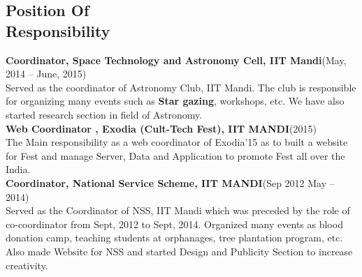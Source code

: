 \documentclass[a4paper,margin,line]{resume}
\begin{document}
\begin{resume}




	\section{\mysidestyle Position Of\\Responsibility}

	\textbf{Coordinator, Space Technology and Astronomy Cell, IIT Mandi}\hfill(May, 2014 -- June, 2015)\vspace{0.5mm}\\%
	Served  as  the  coordinator  of  Astronomy  Club,  IIT  Mandi.   The  club  is  responsible  for  organizing many events such as \textbf{Star gazing}, workshops, etc.  We have also started research section in field of Astronomy.\\
	\textbf{Web Coordinator , Exodia (Cult-Tech Fest), IIT MANDI}\hfill(2015)\vspace{0.5mm}\\%
	The Main responsibility as a web coordinator of Exodia'15 as to built a website for Fest and manage Server, Data and Application to promote Fest all over the India.\\%
	\textbf{Coordinator, National Service Scheme, IIT MANDI}\hfill(Sep 2012 May -- 2014)\vspace{0.5mm}\\%
	Served as the Coordinator of NSS, IIT Mandi which was preceded by the role of co-coordinator from Sept, 2012 to Sept, 2014.  Organized many events as blood donation camp, teaching students at orphanages, tree plantation program, etc. Also made Website for NSS and started Design and Publicity Section to increase creativity.\\%


\end{resume}
\end{document}
